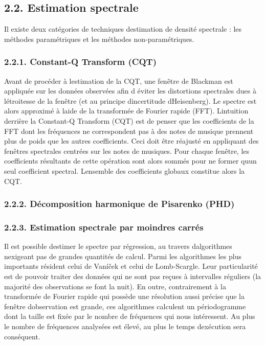 \documentclass[letterpaper]{article}
\begin{document}
\subsection*{2.2. Estimation spectrale}

Il existe deux catégories de techniques d\textquotesingle estimation de densité spectrale : les méthodes paramétriques et les méthodes non-paramétriques.


\subsubsection*{2.2.1. Constant-Q Transform (CQT)}

Avant de procéder à l\textquotesingle estimation de la CQT, une fenêtre de Blackman est appliquée sur les données observées afin d\textquotesingle
 éviter les distortions spectrales dues à l\textquotesingle étroitesse de la fenêtre (et au principe d\textquotesingle incertitude d\textquotesingle Heisenberg).
Le spectre est alors approximé à l\textquotesingle aide de la transformée de Fourier rapide (FFT). L\textquotesingle intuition derrière la Constant-Q 
Transform (CQT)
est de penser que les coefficients de la FFT dont les fréquences ne correspondent pas à des notes de musique prennent plus de poids que les autres
coefficients. Ceci doit être réajusté en appliquant des fenêtres spectrales centrées sur les notes de musiques. Pour chaque fenêtre, les coefficients résultants de cette opération sont alors sommés pour ne former qu\textquotesingle un seul coefficient spectral. L\textquotesingle ensemble des coefficients globaux
constitue alors la CQT.


\subsubsection*{2.2.2. Décomposition harmonique de Pisarenko (PHD)}



\citep{MA}

\subsubsection*{2.2.3. Estimation spectrale par moindres carrés}

Il est possible d\textquotesingle estimer le spectre par régression, au travers d\textquotesingle algorithmes n\textquotesingle exigeant
pas de grandes quantités de calcul. Parmi les algorithmes les plus importants résident celui de Vaníček et celui de Lomb-Scargle. Leur particularité est
de pouvoir traiter des données qui ne sont pas reçues à intervalles réguliers (la majorité des observations se font la nuit). En outre, contrairement à la transformée de Fourier rapide qui possède une résolution aussi précise que la fenêtre d\textquotesingle observation est grande, ces algorithmes
calculent un périodogramme dont la taille est fixée par le nombre de fréquences qui nous intéressent. Au plus le nombre de fréquences analysées est
élevé, au plus le temps d\textquotesingle exécution sera conséquent.
\end{document}
